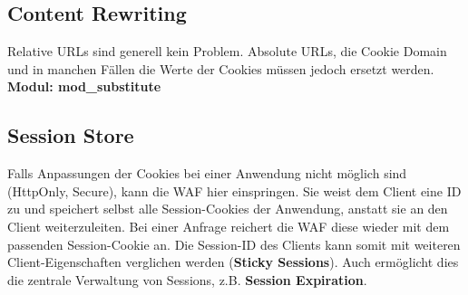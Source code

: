 \subsection{Content Rewriting}
Relative URLs sind generell kein Problem. Absolute URLs, die Cookie Domain und in manchen Fällen die Werte der Cookies müssen jedoch ersetzt werden.\\
\textbf{Modul: mod\_substitute}

\subsection{Session Store}
Falls Anpassungen der Cookies bei einer Anwendung nicht möglich sind (HttpOnly, Secure), kann die WAF hier einspringen. Sie weist dem Client eine ID zu und speichert selbst alle Session-Cookies der Anwendung, anstatt sie an den Client weiterzuleiten. Bei einer Anfrage reichert die WAF diese wieder mit dem passenden Session-Cookie an. Die Session-ID des Clients kann somit mit weiteren Client-Eigenschaften verglichen werden (\textbf{Sticky Sessions}). Auch ermöglicht dies die zentrale Verwaltung von Sessions, z.B. \textbf{Session Expiration}.